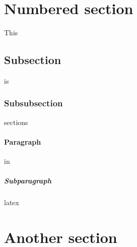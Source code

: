 \section{Numbered section}
This
\subsection{Subsection}
is
\subsubsection{Subsubsection}
sections
\paragraph{Paragraph}
in
\subparagraph{Subparagraph}
latex
\section*{Another section}